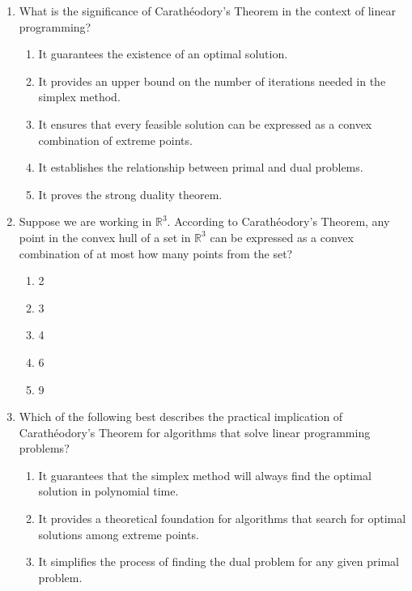 \documentclass{article}%
\begin{document}
\begin{enumerate}
\begin{enumerate}%
\item d%
\item d + 1%
\item d - 1%
\item 2d%
\item d/2%
\end{enumerate}%
\vspace{1em}%
\item What is the significance of Carathéodory's Theorem in the context of linear programming?%
\begin{enumerate}%
\item It guarantees the existence of an optimal solution.%
\item It provides an upper bound on the number of iterations needed in the simplex method.%
\item It ensures that every feasible solution can be expressed as a convex combination of extreme points.%
\item It establishes the relationship between primal and dual problems.%
\item It proves the strong duality theorem.%
\end{enumerate}%
\vspace{1em}%
\item Suppose we are working in $\mathbb{R}^3$. According to Carathéodory's Theorem, any point in the convex hull of a set in $\mathbb{R}^3$ can be expressed as a convex combination of at most how many points from the set?%
\begin{enumerate}%
\item 2%
\item 3%
\item 4%
\item 6%
\item 9%
\end{enumerate}%
\vspace{1em}%
\item Which of the following best describes the practical implication of Carathéodory's Theorem for algorithms that solve linear programming problems?%
\begin{enumerate}%
\item It guarantees that the simplex method will always find the optimal solution in polynomial time.%
\item It provides a theoretical foundation for algorithms that search for optimal solutions among extreme points.%
\item It simplifies the process of finding the dual problem for any given primal problem.%

\end{enumerate}
\end{enumerate}
\end{document}
